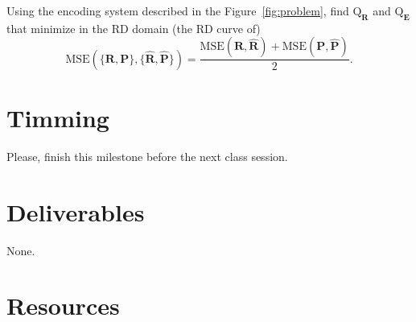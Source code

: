 Using the encoding system described in the Figure~\ref{fig:problem},
find $\text{Q}_{\mathbf{R}}$ and $\text{Q}_{\mathbf{E}}$ that minimize in the RD domain (the RD curve of)
\begin{equation}
  \text{MSE}(\{\mathbf{R},\mathbf{P}\},\{\hat{\mathbf{R}},\hat{\mathbf{P}}\}) = \frac{\text{MSE}({\mathbf R},\hat{\mathbf R}) + \text{MSE}({\mathbf P},\hat{\mathbf P})}{2}.
\end{equation}
  
\begin{comment}
In this
\href{https://github.com/Sistemas-Multimedia/Sistemas-Multimedia.github.io/blob/master/milestones/09-ME/optical_flow.ipynb}{notebook}
you can find how to estimate the OF between two frames. Please, modify
it to find suitable values for the parameters \texttt{levels},
\texttt{winsize} and \texttt{iterations}. Supposing that the impact of
each parameter is independent from the rest, a way of comparing two
different configurations is to trace RD curves using a spatial
decorrelation, quantization and compressing the MC residues.
\end{comment}

\section{Timming}

Please, finish this milestone before the next class session.

\section{Deliverables}

None.

\section{Resources}

\renewcommand{\addcontentsline}[3]{}%

